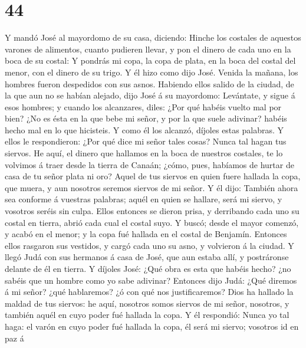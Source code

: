 \hypertarget{section-43}{%
\section{44}\label{section-43}}

 Y mandó José al mayordomo de su casa, diciendo: Hinche
los costales de aquestos varones de alimentos, cuanto pudieren llevar, y
pon el dinero de cada uno en la boca de su costal:  Y
pondrás mi copa, la copa de plata, en la boca del costal del menor, con
el dinero de su trigo. Y él hizo como dijo José.  Venida
la mañana, los hombres fueron despedidos con sus asnos. 
Habiendo ellos salido de la ciudad, de la que aun no se habían alejado,
dijo José á su mayordomo: Levántate, y sigue á esos hombres; y cuando
los alcanzares, diles: ¿Por qué habéis vuelto mal por bien?
 ¿No es ésta en la que bebe mi señor, y por la que suele
adivinar? habéis hecho mal en lo que hicisteis.  Y como él
los alcanzó, díjoles estas palabras.  Y ellos le
respondieron: ¿Por qué dice mi señor tales cosas? Nunca tal hagan tus
siervos.  He aquí, el dinero que hallamos en la boca de
nuestros costales, te lo volvimos á traer desde la tierra de Canaán;
¿cómo, pues, habíamos de hurtar de casa de tu señor plata ni oro?
 Aquel de tus siervos en quien fuere hallada la copa, que
muera, y aun nosotros seremos siervos de mi señor.  Y él
dijo: También ahora sea conforme á vuestras palabras; aquél en quien se
hallare, será mi siervo, y vosotros seréis sin culpa. 
Ellos entonces se dieron prisa, y derribando cada uno su costal en
tierra, abrió cada cual el costal suyo.  Y buscó; desde
el mayor comenzó, y acabó en el menor; y la copa fué hallada en el
costal de Benjamín.  Entonces ellos rasgaron sus
vestidos, y cargó cada uno su asno, y volvieron á la ciudad.
 Y llegó Judá con sus hermanos á casa de José, que aun
estaba allí, y postráronse delante de él en tierra.  Y
díjoles José: ¿Qué obra es esta que habéis hecho? ¿no sabéis que un
hombre como yo sabe adivinar?  Entonces dijo Judá: ¿Qué
diremos á mi señor? ¿qué hablaremos? ¿ó con qué nos justificaremos? Dios
ha hallado la maldad de tus siervos: he aquí, nosotros somos siervos de
mi señor, nosotros, y también aquél en cuyo poder fué hallada la copa.
 Y él respondió: Nunca yo tal haga: el varón en cuyo
poder fué hallada la copa, él será mi siervo; vosotros id en paz á
